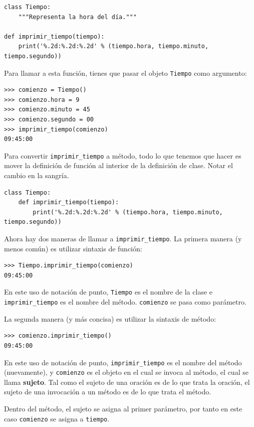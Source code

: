 \documentclass[10pt]{book}
\begin{document}
\begin{verbatim}
class Tiempo:
    """Representa la hora del día."""

def imprimir_tiempo(tiempo):
    print('%.2d:%.2d:%.2d' % (tiempo.hora, tiempo.minuto, tiempo.segundo))
\end{verbatim}
%
Para llamar a esta función, tienes que pasar el objeto {\tt Tiempo} como
argumento:

\begin{verbatim}
>>> comienzo = Tiempo()
>>> comienzo.hora = 9
>>> comienzo.minuto = 45
>>> comienzo.segundo = 00
>>> imprimir_tiempo(comienzo)
09:45:00
\end{verbatim}
%
Para convertir \verb"imprimir_tiempo" a método, todo lo que tenemos que hacer es
mover la definición de función al interior de la definición de clase.  Notar
el cambio en la sangría.

\begin{verbatim}
class Tiempo:
    def imprimir_tiempo(tiempo):
        print('%.2d:%.2d:%.2d' % (tiempo.hora, tiempo.minuto, tiempo.segundo))
\end{verbatim}
%
Ahora hay dos maneras de llamar a \verb"imprimir_tiempo".  La primera manera
(y menos común) es utilizar sintaxis de función:

\begin{verbatim}
>>> Tiempo.imprimir_tiempo(comienzo)
09:45:00
\end{verbatim}
%
En este uso de notación de punto, {\tt Tiempo} es el nombre de la clase
e \verb"imprimir_tiempo" es el nombre del método.  {\tt comienzo} se
pasa como parámetro.

La segunda manera (y más concisa) es utilizar la sintaxis de método:

\begin{verbatim}
>>> comienzo.imprimir_tiempo()
09:45:00
\end{verbatim}
%
En este uso de notación de punto, \verb"imprimir_tiempo" es el nombre del
método (nuevamente), y {\tt comienzo} es el objeto en el cual se invoca
al método, el cual se llama {\bf sujeto}.  Tal como el
sujeto de una oración es de lo que trata la oración, el sujeto
de una invocación a un método es de lo que trata el método.

Dentro del método, el sujeto se asigna al primer
parámetro, por tanto en este caso {\tt comienzo} se asigna
a {\tt tiempo}.
\end{document}
